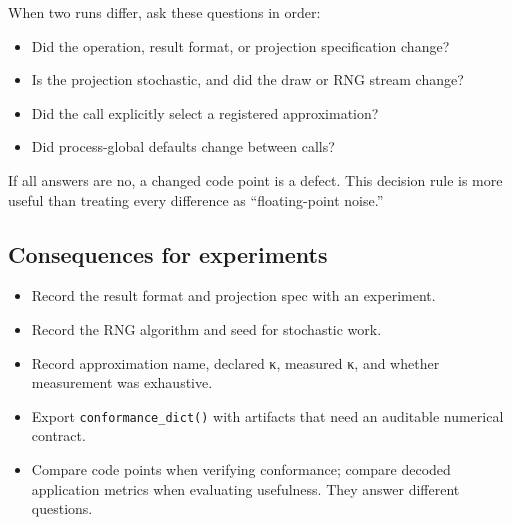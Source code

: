 \label{17718339924439357099}{}


When two runs differ, ask these questions in order:



\begin{itemize}
\item[1. ] Did the operation, result format, or projection specification change?


\item[2. ] Is the projection stochastic, and did the draw or RNG stream change?


\item[3. ] Did the call explicitly select a registered approximation?


\item[4. ] Did process-global defaults change between calls?

\end{itemize}


If all answers are no, a changed code point is a defect. This decision rule is more useful than treating every difference as “floating-point noise.”



\subsection{Consequences for experiments}



\label{9693703429377784845}{}


\begin{itemize}
\item Record the result format and projection spec with an experiment.


\item Record the RNG algorithm and seed for stochastic work.


\item Record approximation name, declared κ, measured κ, and whether measurement was exhaustive.


\item Export \texttt{conformance\_\allowbreak{}dict()} with artifacts that need an auditable numerical contract.


\item Compare code points when verifying conformance; compare decoded application metrics when evaluating usefulness. They answer different questions.

\end{itemize}


